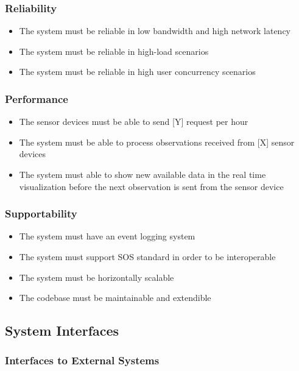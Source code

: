 \subsubsection{Reliability}

\begin{itemize}
	\item The system must be reliable in low bandwidth and high network latency
	\item The system must be reliable in high-load scenarios
	\item The system must be reliable in high user concurrency scenarios
\end{itemize}

\subsubsection{Performance}

\begin{itemize}
	\item The sensor devices must be able to send [Y] request per hour
	\item The system must be able to process observations received from [X] sensor devices
	\item The system must able to show new available data in the real time visualization before the next observation is sent from the sensor device
\end{itemize}

\subsubsection{Supportability}

\begin{itemize}
	\item The system must have an event logging system
	\item The system must support SOS standard in order to be interoperable
	\item The system must be horizontally scalable
	\item The codebase must be maintainable and extendible
\end{itemize}

\subsection{System Interfaces}

\subsubsection{Interfaces to External Systems}

